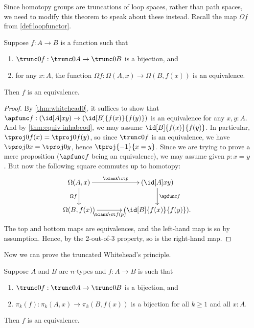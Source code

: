 Since homotopy groups are truncations of loop spaces, rather than path spaces, we need to modify this theorem to speak about these instead. Recall the map $\Omega f$ from \cref{def:loopfunctor}.

\begin{cor}\label{thm:whitehead1}
  Suppose $f:A\to B$ is a function such that
  \begin{enumerate}
  \item $\trunc0 f : \trunc0 A \to \trunc0 B$ is a bijection, and
  \item for any $x:A$, the function $\Omega f : \Omega(A,x) \to \Omega(B,f(x))$ is an equivalence.
  \end{enumerate}
  Then $f$ is an equivalence.
\end{cor}
\begin{proof}
  By \cref{thm:whitehead0}, it suffices to show that $\apfunc f : (\id[A]xy) \to (\id[B]{f(x)}{f(y)})$ is an equivalence for any $x,y:A$.
  And by \cref{thm:equiv-inhabcod}, we may assume $\id[B]{f(x)}{f(y)}$.
  In particular, $\tproj0{f(x)} = \tproj0{f(y)}$, so since $\trunc0 f$ is an equivalence, we have $\tproj0 x = \tproj0y$, hence $\tproj{-1}{x=y}$.
  Since we are trying to prove a mere proposition ($\apfunc f$ being an equivalence), we may assume given $p:x=y$.
  But now the following square commutes up to homotopy:
  \begin{equation*}
  \vcenter{\xymatrix@C=3pc{
      \Omega(A,x)\ar[r]^-{\blank\ct p}\ar[d]_{\Omega f} &
      (\id[A]xy) \ar[d]^{\apfunc f}\\
      \Omega(B,f(x))\ar[r]_-{\blank\ct f(p)} &
      (\id[B]{f(x)}{f(y)}).
      }}
  \end{equation*}
  The top and bottom maps are equivalences, and the left-hand map is so by assumption.
  Hence, by the 2-out-of-3 property, so is the right-hand map.
\end{proof}

Now we can prove the truncated Whitehead's principle.

\begin{thm}\label{thm:whiteheadn}
  Suppose $A$ and $B$ are $n$-types and $f:A\to B$ is such that
  \begin{enumerate}
  \item $\trunc0f:\trunc0A \to \trunc0B$ is a bijection, and\label{item:wh0}
  \item $\pi_k(f):\pi_k(A,x) \to \pi_k(B,f(x))$ is a bijection for all $k\ge 1$ and all $x:A$.\label{item:whk}
  \end{enumerate}
  Then $f$ is an equivalence.
\end{thm}


